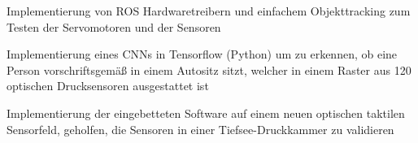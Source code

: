 \begin{cventries}
{{\begin{cvitems}
        \item {Implementierung von ROS Hardwaretreibern und einfachem Objekttracking zum Testen der Servomotoren und der Sensoren}
        \item {Implementierung eines CNNs in Tensorflow (Python) um zu erkennen, ob eine Person vorschriftsgemäß in einem Autositz sitzt, welcher in einem Raster aus 120 optischen Drucksensoren ausgestattet ist}
        \item {Implementierung der eingebetteten Software auf einem neuen optischen taktilen Sensorfeld, geholfen, die Sensoren in einer Tiefsee-Druckkammer zu validieren}
      \end{cvitems}
    }
  }


\end{cventries}
